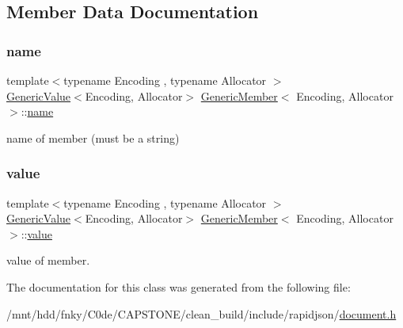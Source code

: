 \subsection{Member Data Documentation}
\mbox{\label{classGenericMember_a7124f7ccd67421533d33139938604fac}} 
\subsubsection{\texorpdfstring{name}{name}}
{\footnotesize\ttfamily template$<$typename Encoding , typename Allocator $>$ \\
\hyperlink{classGenericValue}{Generic\+Value}$<$Encoding, Allocator$>$ \hyperlink{classGenericMember}{Generic\+Member}$<$ Encoding, Allocator $>$\+::\hyperlink{imgui__impl__opengl3__loader_8h_a5c4947d4516dd7cfa3505ce3a648a4ef}{name}}



name of member (must be a string) 

\mbox{\label{classGenericMember_aad3cfa4f9e8b9018068c8bc865723083}} 
\subsubsection{\texorpdfstring{value}{value}}
{\footnotesize\ttfamily template$<$typename Encoding , typename Allocator $>$ \\
\hyperlink{classGenericValue}{Generic\+Value}$<$Encoding, Allocator$>$ \hyperlink{classGenericMember}{Generic\+Member}$<$ Encoding, Allocator $>$\+::\hyperlink{imgui__impl__opengl3__loader_8h_a32aff7c6c4cd253fdf6563677afab5ce}{value}}



value of member. 



The documentation for this class was generated from the following file\+:\begin{DoxyCompactItemize}
\item 
/mnt/hdd/fnky/\+C0de/\+C\+A\+P\+S\+T\+O\+N\+E/clean\+\_\+build/include/rapidjson/\hyperlink{document_8h}{document.\+h}\end{DoxyCompactItemize}
